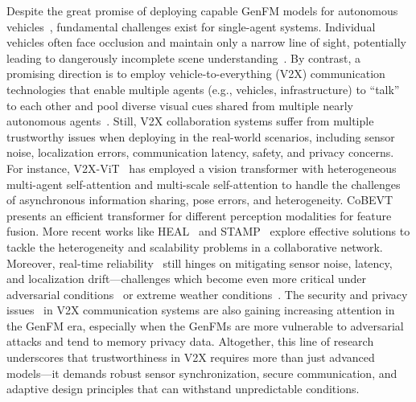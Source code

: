 Despite the great promise of deploying capable GenFM models for autonomous vehicles~\cite{hwang2024emma}, fundamental challenges exist for single-agent systems. 
Individual vehicles often face occlusion and maintain only a narrow line of sight, potentially leading to dangerously incomplete scene understanding~\cite{wang2020v2vnet}. By contrast, a promising direction is to employ vehicle-to-everything (V2X) communication technologies that enable multiple agents (e.g., vehicles, infrastructure) to ``talk'' to each other and pool diverse visual cues shared from multiple nearly autonomous agents~\cite{wang2020v2vnet,xu2022v2x,xu2022cobevt,li2022v2x,xu2022opv2v,xu2023v2v4real,li2024comamba}. Still, V2X collaboration systems suffer from multiple trustworthy issues when deploying in the real-world scenarios, including sensor noise, localization errors, communication latency, safety, and privacy concerns. For instance, V2X-ViT~\cite{xu2022v2x} has employed a vision transformer with heterogeneous multi-agent self-attention and multi-scale self-attention to handle the challenges of asynchronous information sharing, pose errors, and heterogeneity.
CoBEVT~\cite{xu2022cobevt} presents an efficient transformer for different perception modalities for feature fusion.
More recent works like HEAL~\cite{lu2024extensible} and STAMP~\cite{anonymous2025stamp} explore effective solutions to tackle the heterogeneity and scalability problems in a collaborative network.
Moreover, real-time reliability~\cite{li2024comamba}
 still hinges on mitigating sensor noise, latency, and localization drift—challenges which become even more critical under adversarial conditions~\cite{xiang2023v2xp} or extreme weather conditions~\cite{li2024v2x,zhu2024mwformer}.
The security and privacy issues~\cite{yoshizawa2023survey} in V2X communication systems are also gaining increasing attention in the GenFM era, especially when the GenFMs are more vulnerable to adversarial attacks and tend to memory privacy data.
Altogether, this line of research underscores that trustworthiness in V2X requires more than just advanced models—it demands robust sensor synchronization, secure communication, and adaptive design principles that can withstand unpredictable conditions.


